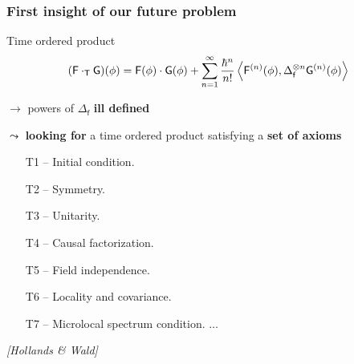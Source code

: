 \documentclass[9pt]{beamer}
\newcommand{\sm}[1]{\left\langle #1 \right\rangle}
\newcommand{\citebeam}[1]{\textit{\textcolor{black!60!white}{[#1]}}}
\newcommand{\Fsf}{\mathsf{F}}
\newcommand{\Gsf}{\mathsf{G}}
\newcommand{\Tsf}{\mathsf{T}}
\newcommand{\fsf}{\mathsf{f}}
\begin{document}

\begin{frame}

\frametitle{First insight of our future problem}

\vfill

\begin{exampleblock}{Time ordered product \ \textdbend}
\vspace*{-15pt}
\begin{equation*} 
(\Fsf \cdot_\Tsf \Gsf)(\phi) = \Fsf(\phi) \cdot \Gsf(\phi) + \sum_{n=1}^\infty \frac{\hbar^n}{n!} \sm{\Fsf^{(n)}(\phi), \Delta_{\fsf}^{\otimes n} \Gsf^{(n)}(\phi)} 
\vspace*{-8pt}
\end{equation*}
\end{exampleblock}

\begin{center}
$\to$ powers of $\Delta_\fsf$ \textbf{ill defined} \ \textdbend
\end{center}

\vfill

$\leadsto$ \textbf{looking for} a time ordered product satisfying a \textbf{set of axioms}
\vspace*{-10pt}
%
\begin{multicols}{2}
\begin{itemize}
\setlength\itemsep{-2pt}
\item[T1 -- Initial condition.] 
\item[T2 -- Symmetry.]
\item[T3 -- Unitarity.]
\item[T4 -- Causal factorization.]
\item[T5 -- Field independence.]
\item[T6 -- Locality and covariance.]
\item[T7 -- Microlocal spectrum condition.] 
\hspace*{-13pt} $\dots$
\end{itemize}
\end{multicols}
\hfill\citebeam{Hollands \& Wald}

\vfill

\end{frame} 

\end{document}
